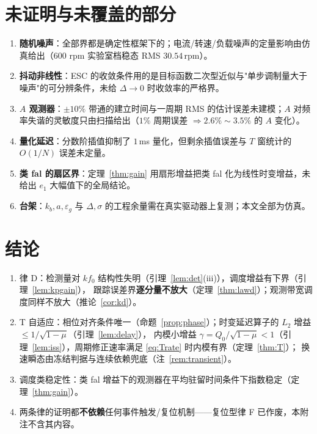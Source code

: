 \documentclass[11pt,a4paper]{article}
\theoremstyle{remark}
\begin{document}
\section{未证明与未覆盖的部分}\label{sec:unproven}
\begin{enumerate}
\item \textbf{随机噪声}：全部界都是确定性框架下的；电流/转速/负载噪声的定量影响由仿真给出（600 rpm 实验室档稳态 RMS $30.54$\,rpm）。
\item \textbf{抖动非线性}：ESC 的收敛条件用的是目标函数二次型近似与"单步调制量大于噪声"的可分辨条件，未给 $\Delta\to0$ 时收敛率的严格界。
\item \textbf{$A$ 观测器}：$\pm10\%$ 带通的建立时间与一周期 RMS 的估计误差未建模；$A$ 对频率失谐的灵敏度只由扫描给出（$1\%$ 周期误差 $\Rightarrow 2.6\%\sim3.5\%$ 的 $A$ 变化）。
\item \textbf{量化延迟}：分数阶插值抑制了 $1$\,ms 量化，但剩余插值误差与 $T$ 窗统计的 $O(1/N)$ 误差未定量。
\item \textbf{类 fal 的扇区界}：定理~\ref{thm:gain} 用扇形增益把类 fal 化为线性时变增益，未给出 $e_1$ 大幅值下的全局结论。
\item \textbf{台架}：$k_b,a,\varepsilon_g$ 与 $\Delta,\sigma$ 的工程余量需在真实驱动器上复测；本文全部为仿真。
\end{enumerate}

\section{结论}
\begin{enumerate}
\item 律 D：检测量对 $k f_0$ 结构性失明（引理~\ref{lem:det}(iii)），调度增益有下界（引理~\ref{lem:kpgain}），
      跟踪误差界\textbf{逐分量不放大}（定理~\ref{thm:lawd}）；观测带宽调度同样不放大（推论~\ref{cor:kd}）。
\item T 自适应：相位对齐条件唯一（命题~\ref{prop:phase}）；时变延迟算子的 $L_2$ 增益 $\le1/\sqrt{1-\mu}$（引理~\ref{lem:delay}），
      内模小增益 $\gamma=Q_0/\sqrt{1-\mu}<1$（引理~\ref{lem:iss}），周期修正速率满足 \eqref{eq:Trate} 时内模有界（定理~\ref{thm:T}）；
      换速瞬态由冻结判据与连续依赖兜底（注~\ref{rem:transient}）。
\item 调度类稳定性：类 fal 增益下的观测器在平均驻留时间条件下指数稳定（定理~\ref{thm:gain}）。
\item 两条律的证明都\textbf{不依赖}任何事件触发/复位机制——复位型律 F 已作废，本附注不含其内容。
\end{enumerate}
\end{document}
